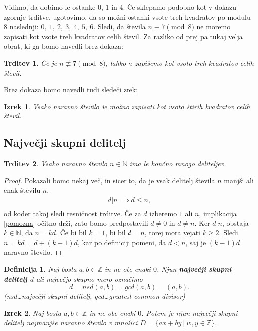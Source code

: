 \documentclass[12pt, a4paper]{article}
\newtheorem{defi}{Definicija}
\newtheorem{trd}{Trditev}
\newtheorem{izr}{Izrek}
\begin{document}
Vidimo, da dobimo le ostanke $0$, $1$ in $4$. Če sklepamo podobno kot v dokazu zgornje trditve, ugotovimo, da so možni ostanki vsote treh kvadratov po modulu $8$ naslednji: $0,\ 1,\ 2,\ 3,\ 4,\ 5,\ 6$. Sledi, da števila $n\equiv 7 \pmod8$ ne moremo zapisati kot vsote treh kvadratov celih števil. Za razliko od prej pa tukaj velja obrat, ki ga bomo navedli brez dokaza:

\begin{trd}
Če je $n\not\equiv 7 \pmod 8$, lahko $n$ zapišemo kot vsoto treh kvadratov celih števil.
\end{trd}

Brez dokaza bomo navedli tudi sledeči zrek:
\begin{izr}
Vsako naravno število je možno zapisati kot vsoto štirih kvadratov celih števil.
\end{izr}

\subsection{Največji skupni delitelj}

\begin{trd}
Vsako naravno število $n\in \mathbb{N}$ ima le končno mnogo deliteljev.
\end{trd}

\begin{proof}
Pokazali bomo nekaj več, in sicer to, da je vsak delitelj števila $n$ manjši ali enak številu $n$,
\begin{align*}
d|n \implies d\leq n, \tag{$\ast$}\label{pomozna}\\
\end{align*}
od koder takoj sledi resničnost trditve. Če za $d$ izberemo $1$ ali $n$, implikacija \eqref{pomozna} očitno drži, zato bomo predpostavili $d\neq 0$ in $d\neq n$. Ker $d|n$, obstaja $k\in \mathbb{N}$, da $n=kd$. Če bi bil $k=1$, bi bil $d=n$, torej mora vejati $k\geq 2$. Sledi $n=kd=d + (k-1)d$, kar po definiciji pomeni, da $d<n$, saj je $(k-1)d$ naravno število.
\end{proof}

\begin{defi}
Naj bosta $a,b\in \mathbb{Z}$ in ne obe enaki $0$. Njun \textbf{največji skupni delitelj $d$} ali največjo skupno mero označimo $$d=nsd(a,b)=gcd(a,b)=(a,b).$$ (nsd\dots največji skupni delitelj, gcd\dots greatest common divisor)
\end{defi}

\begin{izr}
Naj bosta $a,b\in \mathbb{Z}$ in ne obe enaki $0$. Potem je njun največji skupni delitelj najmanjše naravno število v množici $D=\{ ax+by \ | \ w,y\in \mathbb{Z}\}$.
\end{izr}
\end{document}

